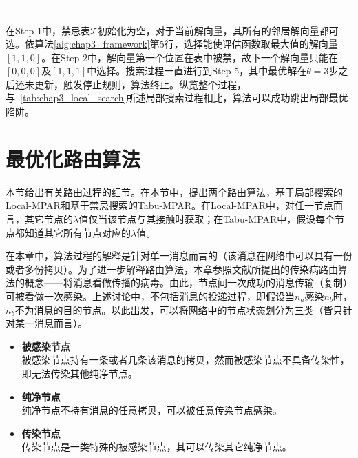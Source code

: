 \begin{table}[hbt]
{\begin{tabular}{|c|c|c|c|c|c|c|c|c|c|c|c|}
    \multicolumn{1}{|c|}{}
    &\multicolumn{1}{c|}{}
    &\multicolumn{1}{c|}{}
    &\multicolumn{1}{c|}{}
    &\multicolumn{1}{c|}{}
    &\multicolumn{1}{c|}{}
    &\multicolumn{1}{c|}{}
    &\multicolumn{1}{c|}{}
    & &  &  &
    \\
    
    \multicolumn{1}{|c|}{}
    &\multicolumn{1}{c|}{}
    &\multicolumn{1}{c|}{}
    &\multicolumn{1}{c|}{}
    &\multicolumn{1}{c|}{}
    &\multicolumn{1}{c|}{}
    &\multicolumn{1}{c|}{}
    &\multicolumn{1}{c|}{}
    & &  &  &
    \\    
    \hline    
  \end{tabular}}
  \label{tab:chap3_tabu_search}
\end{table}

在Step 1中，禁忌表$\mathcal{T}$初始化为空，对于当前解向量，其所有的邻居解向量都可选。依算法\ref{alg:chap3_framework}第5行，选择能使评估函数取最大值的解向量$[1,1,0]$。在Step 2中，解向量第一个位置在表中被禁，故下一个解向量只能在$[0,0,0]$及$[1,1,1]$中选择。搜索过程一直进行到Step 5，其中最优解在$\theta=3$步之后还未更新，触发停止规则，算法终止。纵览整个过程，与\tablename~\ref{tab:chap3_local_search}所述局部搜索过程相比，算法可以成功跳出局部最优陷阱。

\section{最优化路由算法}
\label{chap3:最优化路由算法}

本节给出有关路由过程的细节。在本节中，提出两个路由算法，基于局部搜索的Local-MPAR和基于禁忌搜索的Tabu-MPAR。在Local-MPAR中，对任一节点而言，其它节点的$\lambda$值仅当该节点与其接触时获取；在Tabu-MPAR中，假设每个节点都知道其它所有节点对应的$\lambda$值。

在本章中，算法过程的解释是针对单一消息而言的（该消息在网络中可以具有一份或者多份拷贝）。为了进一步解释路由算法，本章参照文献\cite{Vahdat2000}所提出的传染病路由算法的概念——将消息看做传播的病毒。由此，节点间一次成功的消息传输（复制）可被看做一次感染。上述讨论中，不包括消息的投递过程，即假设当$n_a$感染$n_b$时，$n_b$不为消息的目的节点。以此出发，可以将网络中的节点状态划分为三类（皆只针对某一消息而言）。

\begin{itemize}
\item \textbf{被感染节点}\\
被感染节点持有一条或者几条该消息的拷贝，然而被感染节点不具备传染性，即无法传染其他纯净节点。

\item \textbf{纯净节点}\\
纯净节点不持有消息的任意拷贝，可以被任意传染节点感染。

\item \textbf{传染节点}\\
传染节点是一类特殊的被感染节点，其可以传染其它纯净节点。
\end{itemize}

